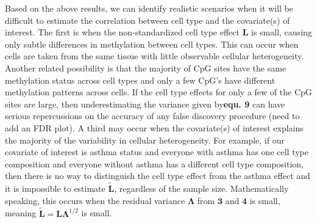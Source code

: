 \documentclass{article}
\begin{document}
\indent Based on the above results, we can identify realistic scenarios when it will be difficult to estimate the correlation between cell type and the covariate(s) of interest. The first is when the non-standardized cell type effect $\bm{L}$ is small, causing only subtle differences in methylation between cell types. This can occur when cells are taken from the same tissue with little observable cellular heterogeneity. Another related possibility is that the majority of CpG sites have the same methylation status across cell types and only a few CpG's have different methylation patterns across cells. If the cell type effects for only a few of the CpG sites are large, then underestimating the variance given by\textbf{equ. 9} can have serious repercussions on the accuracy of any false discovery procedure (need to add an FDR plot). A third may occur when the covariate(s) of interest explains the majority of the variability in cellular heterogeneity. For example, if our covariate of interest is asthma status and everyone with asthma has one cell type composition and everyone without asthma has a different cell type composition, then there is no way to distinguish the cell type effect from the asthma effect and it is impossible to estimate $\tilde{\bm{L}}$, regardless of the sample size. Mathematically speaking, this occurs when the residual variance $\bm{\Lambda}$ from $\bm{3}$ and $\bm{4}$ is small, meaning $\bm{\tilde{L}} = \bm{L}\bm{\Lambda}^{1/2}$ is small.
\end{document}
